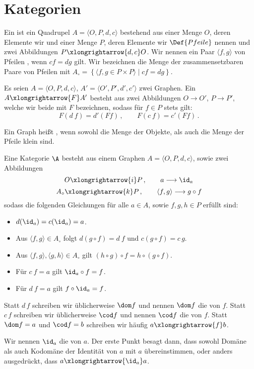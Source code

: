 \section{Kategorien}

Ein  ist ein Quadrupel $A=\langle O,P,d,c \rangle $ bestehend aus einer Menge $O$, deren Elemente wir  und einer Menge $P$, deren Elemente wir $\Def{Pfeile}$ nennen und zwei Abbildungen $P\xlongrightarrow{d,c}O$. Wir nennen ein Paar $\langle f,g\rangle$ von Pfeilen , wenn $cf=dg$ gilt. Wir bezeichnen die Menge der zusammensetzbaren Paare von Pfeilen mit $A_\circ=\left\{\langle f,g\in P\times P\rangle\mid cf=dg \right\}$.

Es seien $A=\langle O,P,d,c \rangle $, $A'=\langle O',P',d',c' \rangle $ zwei Graphen. Ein  $A\xlongrightarrow{F} A'$ besteht aus zwei Abbildungen $O\longrightarrow O'$, $P\longrightarrow P'$, welche wir beide mit $F$ bezeichnen, sodass für $f\in P$ stets gilt:
\[F(d\ f)=d'(Ff)\,,\qquad F(c\ f)=c'(Ff)\,. \]

Ein Graph heißt , wenn sowohl die Menge der Objekte, als auch die Menge der Pfeile klein sind.

Eine Kategorie $\A$ besteht aus einem Graphen $A=\langle O,P,d,c\rangle$, sowie zwei Abbildungen
\[O\xlongrightarrow{i} P\,,\qquad a\longrightarrow \id_a\]
\[A_\circ\xlongrightarrow{k}P\,,\qquad \langle f,g\rangle\longrightarrow g\circ f\]
sodass die folgenden Gleichungen für alle $a\in A$, sowie $f,g,h\in P$ erfüllt sind:
\begin{itemize}
\item $d(\id_a)=c(\id_a)=a$.
\item Aus $\langle f,g\rangle\in A_\circ$ folgt $d(g\circ f)=d\ f$ und $c(g\circ f)=c\,g$.
\item Aus $\langle f,g\rangle,\langle g,h\rangle\in A_\circ$ gilt $(h\circ g)\circ f=h\circ(g\circ f)$.
\item Für $c\ f=a$ gilt $\id_a\circ f=f$.
\item Für $d\ f=a$ gilt $f\circ \id_a=f$.
\end{itemize}
Statt $d\, f$ schreiben wir üblicherweise $\dom f$ und nennen $\dom f$ die  von $f$. Statt $c\, f$ schreiben wir üblicherweise $\cod f$ und nennen $\cod f$ die  von $f$. Statt $\dom f=a$ und $\cod f=b$ schreiben wir häufig $a\xlongrightarrow{f}b$.

Wir nennen $\id_a$ die  von $a$. Der erste Punkt besagt dann, dass sowohl Domäne als auch Kodomäne der Identität von $a$ mit $a$ übereinstimmen, oder anders ausgedrückt, dass $a\xlongrightarrow{\id_a}a$.

